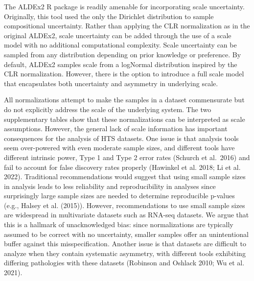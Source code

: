 \documentclass[
]{article}
\begin{document}
The ALDEx2 R package is readily amenable for incorporating scale
uncertainty. Originally, this tool used the only the Dirichlet
distribution to sample compositional uncertainty. Rather than applying
the CLR normalization as in the original ALDEx2, scale uncertainty can
be added through the use of a scale model with no additional
computational complexity. Scale uncertainty can be sampled from any
distribution depending on prior knowledge or preference. By default,
ALDEx2 samples scale from a logNormal distribution inspired by the CLR
normalization. However, there is the option to introduce a full scale
model that encapsulates both uncertainty and asymmetry in underlying
scale.

All normalizations attempt to make the samples in a dataset commensurate
but do not explicitly address the scale of the underlying system. The
two supplementary tables show that these normalizations can be
interpreted as scale assumptions. However, the general lack of scale
information has important consequences for the analysis of HTS datasets.
One issue is that analysis tools seem over-powered with even moderate
sample sizes, and different tools have different intrinsic power, Type 1
and Type 2 error rates (Schurch et al.~2016) and fail to account for
false discovery rates properly (Hawinkel et al. 2018; Li et al. 2022).
Traditional recommendations would suggest that using small sample sizes
in analysis leads to less reliability and reproducibility in analyses
since surprisingly large sample sizes are needed to determine
reproducible p-values (e.g., Halsey et al. (2015)). However,
recommendations to use small sample sizes are widespread in multivariate
datasets such as RNA-seq datasets. We argue that this is a hallmark of
unacknowledged bias: since normalizations are typically assumed to be
correct with no uncertainty, smaller samples offer an unintentional
buffer against this misspecification. Another issue is that datasets are
difficult to analyze when they contain systematic asymmetry, with
different tools exhibiting differing pathologies with these datasets
(Robinson and Oshlack 2010; Wu et al. 2021).
\end{document}
